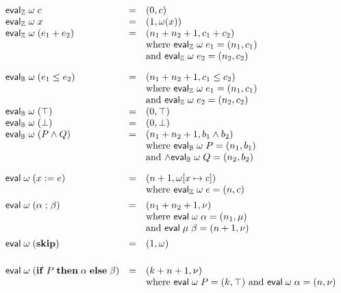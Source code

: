 \documentclass[11pt]{article}
\begin{document}
\begin{figure}[ht]
  \[
    \begin{array}{lcll}
      \mathsf{eval}_{\mathbb{Z}}\; \omega\; c & = & (0, c) \\
      \mathsf{eval}_{\mathbb{Z}}\; \omega\; x & = & (1, \omega(x)) \\
      \mathsf{eval}_{\mathbb{Z}}\; \omega\; (e_1 + e_2) & = & (n_1 + n_2 + 1, c_1 + c_2) \\
                          & & \mbox{where $\mathsf{eval}_{\mathbb{Z}}\; \omega\; e_1 = (n_1, c_1)$} \\
                          & & \mbox{and $\mathsf{eval}_{\mathbb{Z}}\; \omega\; e_2 = (n_2, c_2)$}
      \\[1em]
      \mathsf{eval}_{\mathbb{B}}\; \omega\; (e_1 \leq e_2) & = & (n_1 + n_2 + 1, c_1 \leq c_2) \\
                          & & \mbox{where $\mathsf{eval}_{\mathbb{Z}}\; \omega\; e_1 = (n_1, c_1)$} \\
                          & & \mbox{and $\mathsf{eval}_{\mathbb{Z}}\; \omega\; e_2 = (n_2, c_2)$} \\
      \mathsf{eval}_{\mathbb{B}}\; \omega\; (\top) & = & (0, \top) \\
      \mathsf{eval}_{\mathbb{B}}\; \omega\; (\bot) & = & (0, \bot) \\
      \mathsf{eval}_{\mathbb{B}}\; \omega\; (P \land Q) & = & (n_1 + n_2 + 1, b_1 \land b_2) \\
                          & & \mbox{where $\mathsf{eval}_{\mathbb{B}}\; \omega\; P = (n_1, b_1)$} \\
                          & & \mbox{and $\land \mathsf{eval}_{\mathbb{B}}\; \omega\; Q = (n_2, b_2)$}
      \\[1em]
      \mathsf{eval}\; \omega\; (x := e) & = & (n + 1, \omega[x \mapsto c]) \\
                          & & \mbox{where $\mathsf{eval}_{\mathbb{Z}}\; \omega\; e = (n, c)$}
      \\[1ex]
      \mathsf{eval}\; \omega\; (\alpha \mathrel{;} \beta) & = & (n_1 + n_2 + 1, \nu) \\
                          & & \mbox{where $\mathsf{eval}\; \omega\; \alpha = (n_1, \mu)$} \\
                          & & \mbox{and $\mathsf{eval}\; \mu\; \beta = (n+1, \nu)$}
      \\[1ex]
      \mathsf{eval}\; \omega\; (\mathbf{skip}) & = & (1, \omega) \\
      \\[1ex]
      \mathsf{eval}\; \omega\; (\mathbf{if}\; P\; \mathbf{then}\; \alpha\; \mathbf{else}\; \beta)
                          & = & (k + n + 1, \nu) \\
                          & & \mbox{where $\mathsf{eval}\; \omega\; P = (k, \top)$ and $\mathsf{eval}\; \omega\; \alpha = (n, \nu)$} \\

\end{array}\]
\end{figure}
\end{document}
